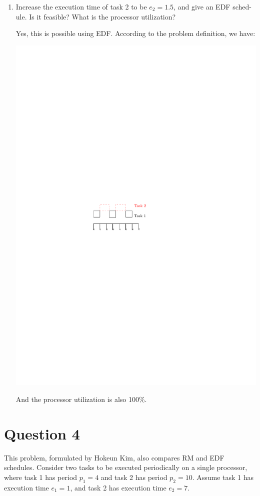 \documentclass[12pt]{article}
\begin{document}
\begin{enumerate}
	\item 
	Increase the execution time of task 2 to be $e_2 = 1.5$, and give an EDF sched-
	ule. Is it feasible? What is the processor utilization?
	\begin{qsolve}
		Yes, this is possible using EDF. According to the problem definition, we have:
		\begin{center}
			\includegraphics*[width=0.3\linewidth]{images/Q3/c.pdf}
		\end{center}
		And the processor utilization is also 100\%.
	\end{qsolve}
	
\end{enumerate}
\vfil
\clearpage

















\section{Question 4}
This problem, formulated by Hokeun Kim, also compares RM and EDF schedules.
Consider two tasks to be executed periodically on a single processor, where task 1
has period $p_1 = 4$ and task 2 has period $p_2 = 10$. Assume task 1 has execution
time $e_1 = 1$, and task 2 has execution time $e_2 = 7$.
\end{document}
